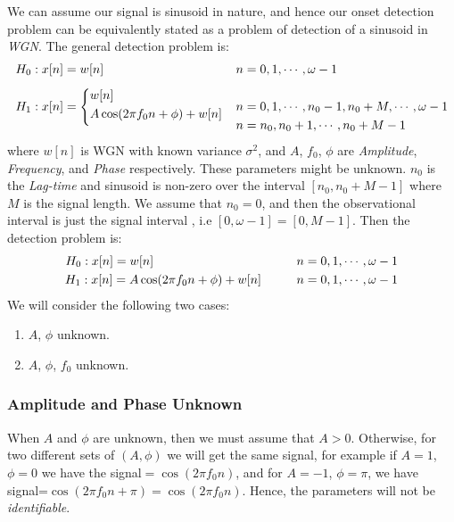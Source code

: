 \documentclass[10pt]{article}
\begin{document}
\qquad We can assume our signal is sinusoid in nature, and hence our onset detection problem can be equivalently stated as a problem of detection of a sinusoid in \textit{WGN}. The general detection problem is:
\begin{align*}
H_0: x[n]&=w[n] && n=0,1,\cdots, \omega-1\\\\ 
H_1: x[n]&= \smash{\left\{\begin{array}{@{}l@{}}
           w[n] \\[\jot] 
           A\cos(2\pi f_0n+\phi)+w[n] \\[\jot] 
           \end{array}\right.} && n=0,1,\cdots, n_0-1, n_0+M, \cdots, \omega-1 \\
  & && n=n_0,n_0+1,\cdots, n_0+M-1
 \end{align*}
where $w[n]$ is WGN with known variance $\sigma^2$, and $A$, $f_0$, $\phi$ are \textit{Amplitude}, \textit{Frequency}, and \textit{Phase} respectively. These parameters might be unknown. $n_0$ is the \textit{Lag-time} and sinusoid is non-zero over the interval $[n_0, n_0+M-1]$ where $M$ is the signal length. We assume that $n_0=0$, and then the observational interval is just the signal interval , i.e $[0,\omega-1]=[0,M-1]$. Then the detection problem is:
\begin{align*}
 H_0: x[n]=w[n]  \hspace{4.05cm}  n=0,1,\cdots, \omega-1\\ 
 H_1: x[n]= A\cos(2\pi f_0n+\phi)+w[n] \hspace{1cm} n=0,1,\cdots, \omega-1 
 \end{align*}
 We will consider the following two cases:
 \begin{enumerate}
     \item $A$, $\phi$ unknown.
     \item $A$, $\phi$, $f_0$ unknown.
 \end{enumerate}
\subsubsection{Amplitude and Phase Unknown}
When $A$ and $\phi$ are unknown, then we must assume that $A>0$. Otherwise, for two different sets of $(A, \phi)$ we will get the same signal, for example if $A=1$, $\phi=0$ we have the signal$=\cos(2\pi f_0n)$, and for $A=-1$, $\phi=\pi$, we have signal=$\cos(2\pi f_0n+\pi)=\cos(2\pi f_0n)$. Hence, the parameters will not be \textit{identifiable}.
\end{document}
